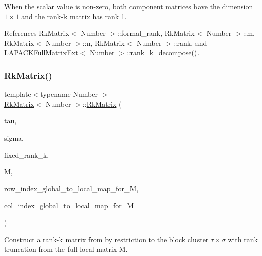 When the scalar value is non-\/zero, both component matrices have the dimension $1 \times 1$ and the rank-\/k matrix has rank 1.

References Rk\+Matrix$<$ Number $>$\+::formal\+\_\+rank, Rk\+Matrix$<$ Number $>$\+::m, Rk\+Matrix$<$ Number $>$\+::n, Rk\+Matrix$<$ Number $>$\+::rank, and L\+A\+P\+A\+C\+K\+Full\+Matrix\+Ext$<$ Number $>$\+::rank\+\_\+k\+\_\+decompose().

\mbox{\label{classRkMatrix_adf204b7ad92834e63c7f63f6b9ca59a9}} 
\subsubsection{\texorpdfstring{Rk\+Matrix()}{RkMatrix()}\hspace{0.1cm}{\footnotesize\ttfamily [8/19]}}
{\footnotesize\ttfamily template$<$typename Number $>$ \\
\hyperlink{classRkMatrix}{Rk\+Matrix}$<$ Number $>$\+::\hyperlink{classRkMatrix}{Rk\+Matrix} (\begin{DoxyParamCaption}\item[{const std\+::vector$<$ types\+::global\+\_\+dof\+\_\+index $>$ \&}]{tau,  }\item[{const std\+::vector$<$ types\+::global\+\_\+dof\+\_\+index $>$ \&}]{sigma,  }\item[{const \hyperlink{classRkMatrix_add060bfc3a4cc77f858c3d6dd58cadd5}{size\+\_\+type}}]{fixed\+\_\+rank\+\_\+k,  }\item[{const \hyperlink{classLAPACKFullMatrixExt}{L\+A\+P\+A\+C\+K\+Full\+Matrix\+Ext}$<$ Number $>$ \&}]{M,  }\item[{const std\+::map$<$ types\+::global\+\_\+dof\+\_\+index, size\+\_\+t $>$ \&}]{row\+\_\+index\+\_\+global\+\_\+to\+\_\+local\+\_\+map\+\_\+for\+\_\+M,  }\item[{const std\+::map$<$ types\+::global\+\_\+dof\+\_\+index, size\+\_\+t $>$ \&}]{col\+\_\+index\+\_\+global\+\_\+to\+\_\+local\+\_\+map\+\_\+for\+\_\+M }\end{DoxyParamCaption})}

Construct a rank-\/k matrix from by restriction to the block cluster $\tau \times \sigma$ with rank truncation from the full local matrix {\ttfamily M}.


